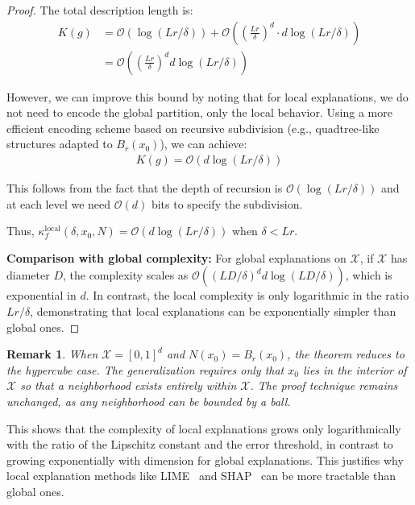 \documentclass[11pt,letter,leqno]{article}
\newtheorem{remark}[theorem]{Remark}
\begin{document}
\begin{proof}
The total description length is:
\begin{align}
K(g) &= \mathcal{O}(\log(Lr/\delta)) + \mathcal{O}\left(\left(\frac{Lr}{\delta}\right)^d \cdot d \log(Lr/\delta)\right) \\
&= \mathcal{O}\left(\left(\frac{Lr}{\delta}\right)^d d \log(Lr/\delta)\right)
\end{align}

However, we can improve this bound by noting that for local explanations, we do not need to encode the global partition, only the local behavior. Using a more efficient encoding scheme based on recursive subdivision (e.g., quadtree-like structures adapted to $B_r(x_0)$), we can achieve:
\begin{align}
K(g) = \mathcal{O}(d \log(Lr/\delta))
\end{align}

This follows from the fact that the depth of recursion is $\mathcal{O}(\log(Lr/\delta))$ and at each level we need $\mathcal{O}(d)$ bits to specify the subdivision.

Thus, $\kappa_f^{\text{local}}(\delta, x_0, N) = \mathcal{O}(d \log(Lr/\delta))$ when $\delta < Lr$.

\textbf{Comparison with global complexity:} For global explanations on $\mathcal{X}$, if $\mathcal{X}$ has diameter $D$, the complexity scales as $\mathcal{O}((LD/\delta)^d d \log(LD/\delta))$, which is exponential in $d$. In contrast, the local complexity is only logarithmic in the ratio $Lr/\delta$, demonstrating that local explanations can be exponentially simpler than global ones.
\end{proof}

\begin{remark}
When $\mathcal{X} = [0,1]^d$ and $N(x_0) = B_r(x_0)$, the theorem 
reduces to the hypercube case. The generalization requires only 
that $x_0$ lies in the interior of $\mathcal{X}$ so that a 
neighborhood exists entirely within $\mathcal{X}$. The proof 
technique remains unchanged, as any neighborhood can be bounded 
by a ball.
\end{remark}

This shows that the complexity of local explanations grows only logarithmically with the ratio of the Lipschitz constant and the error threshold, in contrast to growing exponentially with dimension for global explanations.  This justifies why local explanation methods like LIME~\cite{Ribeiro2016} and SHAP~\cite{Lundberg2017} can be more tractable than global ones.
\end{document}
